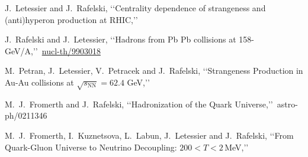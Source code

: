 \begin{thebibliography}{100}
  J.~Letessier and J.~Rafelski,
\lq\lq Centrality dependence of strangeness and (anti)hyperon production at RHIC,\rq\rq\
  

%
%   
  
  J.~Rafelski and J.~Letessier,
\lq\lq Hadrons from Pb Pb collisions at 158-GeV/A,\rq\rq\
\href{https://arxiv.org/abs/nucl-th/9903018}{nucl-th/9903018}


  M.~Petran, J.~Letessier, V.~Petracek and J.~Rafelski,
\lq\lq Strangeness Production in Au-Au collisions at $\sqrt{s_\mathrm{NN}}=62.4$ GeV,\rq\rq\
  
%
%   
  
  M.~J.~Fromerth and J.~Rafelski,
\lq\lq Hadronization of the Quark Universe,\rq\rq\
  astro-ph/0211346 
  
\bibitem{Fromerth:2012fe} 
  M.~J.~Fromerth, I.~Kuznetsova, L.~Labun, J.~Letessier and J.~Rafelski,
\lq\lq From Quark-Gluon Universe to Neutrino Decoupling: $200 <T< 2$\,MeV,\rq\rq\
  
\end{thebibliography}
